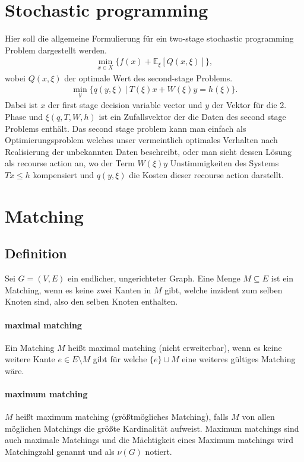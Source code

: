 \documentclass[paper=a4,10pt]{scrartcl}
\begin{document}
\section{Stochastic programming}
Hier soll die allgemeine Formulierung für ein two-stage stochastic programming Problem dargestellt werden.
\begin{align}
\min_{x \in X} \{ f(x) + \mathbb{E}_\xi \left[ Q(x, \xi)\right] \},
\end{align}
wobei $Q(x, \xi)$ der optimale Wert des second-stage Problems.
\begin{align}
\min_y\{ q(y, \xi) \ | \ T(\xi)x + W(\xi)y = h(\xi) \}.
\end{align}
Dabei ist $x$ der first stage decision variable vector und $y$ der Vektor für die 2. Phase und $\xi(q, T,W, h)$ ist ein Zufallsvektor der die Daten des second stage Problems enthält. Das second stage problem kann man einfach als Optimierungsproblem welches unser vermeintlich optimales Verhalten nach Realisierung der unbekannten Daten beschreibt, oder man sieht dessen Lösung als recourse action an, wo der Term $W(\xi)y$ Unstimmigkeiten des Systems $Tx\le h$ kompensiert und $q(y, \xi)$ die Kosten dieser recourse action darstellt.

\section{Matching}
\subsection{Definition}
Sei $G=(V,E)$ ein endlicher, ungerichteter Graph. Eine Menge $M\subseteq E$ ist ein Matching, wenn es keine zwei Kanten in $M$ gibt, welche inzident zum selben Knoten sind, also den selben Knoten enthalten.

\paragraph{maximal matching}
Ein Matching $M$ heißt maximal matching (nicht erweiterbar), wenn es keine weitere Kante $e \in E \setminus M$ gibt für welche $\{ e\} \cup M$ eine weiteres gültiges Matching wäre.

\paragraph{maximum matching}
$M$ heißt maximum matching (größtmögliches Matching), falls $M$ von allen möglichen Matchings die größte Kardinalität aufweist. Maximum matchings sind auch maximale Matchings und die Mächtigkeit eines Maximum matchings wird Matchingzahl genannt und als $\nu(G)$ notiert.
\end{document}
